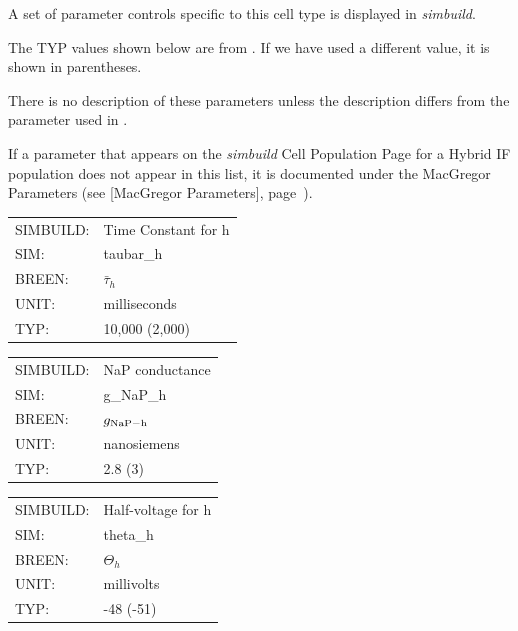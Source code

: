 \documentclass[12pt,openany,oneside]{book}
\newcommand{\tipxref}[1]{see [#1], page~\pageref{#1}}
\newcommand{\prog}[1]{\textit{{#1}}}
\begin{document}
A set of parameter controls specific to this cell type is displayed
in \prog{simbuild}.

\noindent The TYP values shown below are from \citet {breenhybrid2003}. 
If we have
used a different value, it is shown in parentheses.

There is no description of these parameters unless the description
differs from the parameter used in \citet {breenhybrid2003}. 

If a parameter that appears on the \prog{simbuild} Cell Population 
Page for a Hybrid IF population does not appear in this list, it is
documented under the MacGregor Parameters (\tipxref{MacGregor Parameters}).

\begin{flushleft}
\begin{tabular}{@{}ll@{}}
SIMBUILD: & Time Constant for h\\
SIM: & taubar\_h\\
BREEN: & $\bar\tau_h$\\
UNIT: & milliseconds\\
TYP: & 10,000 (2,000)\\
\end{tabular}
\end{flushleft}
\filbreak
\vspace{\baselineskip}

\begin{flushleft}
\begin{tabular}{@{}ll@{}}
SIMBUILD: & NaP conductance\\
SIM: & g\_NaP\_h\\
BREEN: & $g_{\rm NaP-h}$\\
UNIT: & nanosiemens\\
TYP: & 2.8 (3)\\
\end{tabular}
\end{flushleft}
\filbreak
\vspace{\baselineskip}

\begin{flushleft}
\begin{tabular}{@{}ll@{}}
SIMBUILD: & Half-voltage for h\\
SIM: & theta\_h\\
BREEN: & $\Theta_h$\\
UNIT: & millivolts\\
TYP: & -48 (-51)\\
\end{tabular}
\end{flushleft}
\filbreak
\vspace{\baselineskip}
\end{document}
